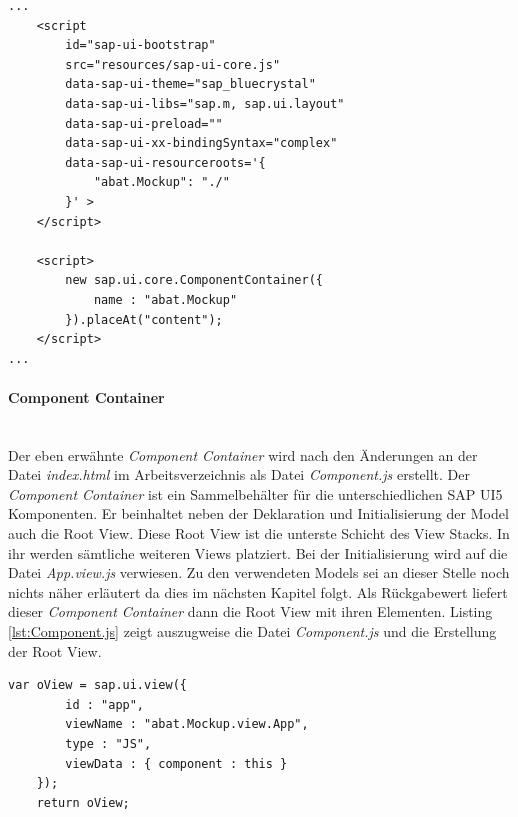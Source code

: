 \vspace{1em}
\begin{lstlisting}[frame=htrbl, caption=Bootstrapping der SAP UI5 Applikation, label=lst:bootstrapping]
...
	<script
		id="sap-ui-bootstrap"
		src="resources/sap-ui-core.js"
		data-sap-ui-theme="sap_bluecrystal"
		data-sap-ui-libs="sap.m, sap.ui.layout"
		data-sap-ui-preload="" 
		data-sap-ui-xx-bindingSyntax="complex"
		data-sap-ui-resourceroots='{
			"abat.Mockup": "./"
		}' >
	</script>

	<script>
		new sap.ui.core.ComponentContainer({
			name : "abat.Mockup"
		}).placeAt("content");
	</script>
...
\end{lstlisting}
	
\paragraph{Component Container}$\;$ \\
Der eben erwähnte \textit{Component Container} wird nach den Änderungen an der Datei \textit{index.html} im Arbeitsverzeichnis als Datei \textit{Component.js} erstellt. Der \textit{Component Container} ist ein Sammelbehälter für die unterschiedlichen SAP UI5 Komponenten. Er beinhaltet neben der Deklaration und Initialisierung der Model auch die Root View. Diese Root View ist die unterste Schicht des View Stacks. In ihr werden sämtliche weiteren Views platziert. Bei der Initialisierung wird auf die Datei \textit{App.view.js} verwiesen. Zu den verwendeten Models sei an dieser Stelle noch nichts näher erläutert da dies im nächsten Kapitel folgt. Als Rückgabewert liefert dieser \textit{Component Container} dann die Root View mit ihren Elementen. Listing \ref{lst:Component.js} zeigt auszugweise die Datei \textit{Component.js} und die Erstellung der Root View.

\vspace{1em}
\begin{lstlisting}[frame=htrbl, caption=Auszug aus der Component.js, label=lst:Component.js]
	var oView = sap.ui.view({
		id : "app",
		viewName : "abat.Mockup.view.App",
		type : "JS",
		viewData : { component : this }
	});
	return oView;
\end{lstlisting}
	
